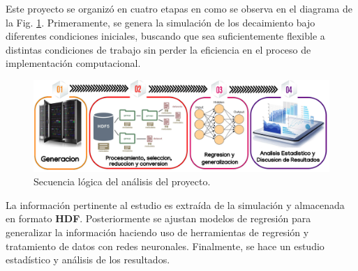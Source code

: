 Este proyecto se organizó en cuatro etapas en como se observa en el diagrama de la Fig. \ref{procesos_darksusy}. Primeramente, se genera la simulación de los decaimiento bajo diferentes condiciones iniciales, buscando que sea suficientemente flexible a distintas condiciones de trabajo sin perder la eficiencia en el proceso de implementación computacional.
\begin{figure}[!b]
\centering
\includegraphics[width=1\textwidth]{Simulacion/imagenes/procesos_darksusy.png}
\caption{Secuencia lógica del análisis del proyecto.}
\label{procesos_darksusy}
\end{figure}
La información pertinente al estudio es extraída de la simulación y almacenada en formato \textbf{HDF}. Posteriormente se ajustan modelos de regresión para generalizar la información haciendo uso de herramientas de regresión y tratamiento de datos con redes neuronales. Finalmente, se hace un estudio estadístico y análisis de los resultados.






